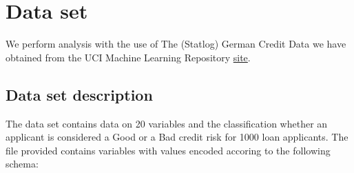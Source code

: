 \documentclass[10pt]{article}\usepackage[]{graphicx}\usepackage[]{color}
\begin{document}
\section{Data set}
We perform analysis with the use of The (Statlog) German Credit Data we have obtained from the UCI Machine Learning Repository \href{http://archive.ics.uci.edu/ml/datasets/Statlog+(German+Credit+Data)}{site}. 


\subsection{Data set description}
The data set contains data on 20 variables and the classification whether an applicant is considered a Good or a Bad credit risk for 1000 loan applicants. The file provided contains variables with values encoded accoring to the following schema: 
\end{document}
